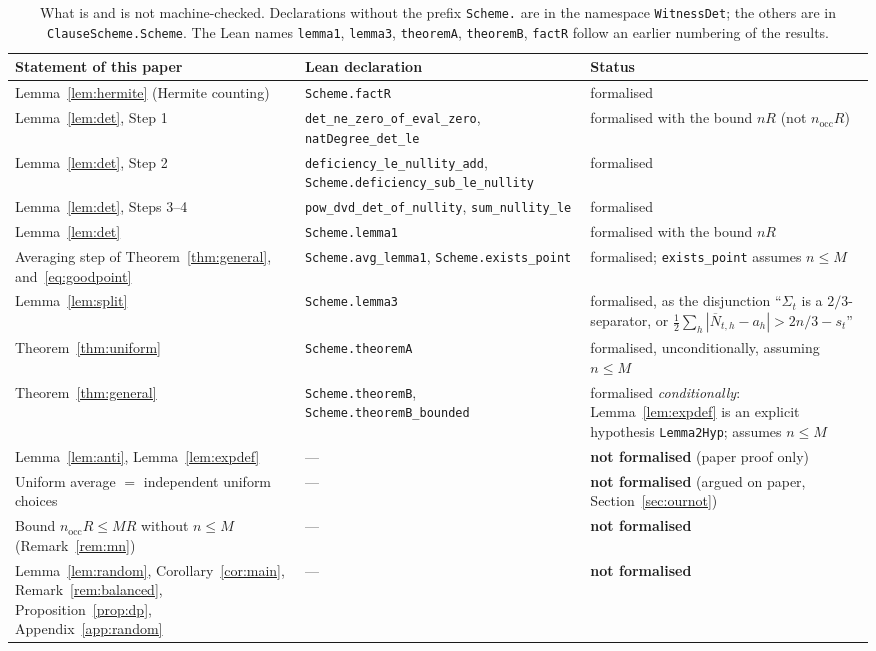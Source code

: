 \documentclass[11pt,a4paper]{article}
\theoremstyle{definition}
\theoremstyle{remark}
\newcommand{\nocc}{n_{\mathrm{occ}}}
\newcommand{\Nbar}{\overline{N}}
\begin{document}
\begin{table}[tb]
\centering
\small
\begin{tabular}{@{}>{\raggedright\arraybackslash}p{3.6cm}>{\raggedright\arraybackslash}p{6.1cm}>{\raggedright\arraybackslash}p{4.9cm}@{}}
\toprule
Statement of this paper & Lean declaration & Status\\
\midrule
Lemma~\ref{lem:hermite} (Hermite counting) & \texttt{Scheme.factR} & formalised\\[2pt]
Lemma~\ref{lem:det}, Step 1 & \texttt{det\_ne\_zero\_of\_eval\_zero}, \newline\texttt{natDegree\_det\_le} & formalised with the bound $nR$ (not $\nocc R$)\\[2pt]
Lemma~\ref{lem:det}, Step 2 & \texttt{deficiency\_le\_nullity\_add}, \newline\texttt{Scheme.deficiency\_sub\_le\_nullity} & formalised\\[2pt]
Lemma~\ref{lem:det}, Steps 3--4 & \texttt{pow\_dvd\_det\_of\_nullity}, \newline\texttt{sum\_nullity\_le} & formalised\\[2pt]
Lemma~\ref{lem:det} & \texttt{Scheme.lemma1} & formalised with the bound $nR$\\[2pt]
Averaging step of Theorem~\ref{thm:general}, and~\eqref{eq:goodpoint} & \texttt{Scheme.avg\_lemma1}, \newline\texttt{Scheme.exists\_point} & formalised; \texttt{exists\_point} assumes $n\le M$\\[2pt]
Lemma~\ref{lem:split} & \texttt{Scheme.lemma3} & formalised, as the disjunction ``$\Sigma_t$ is a $2/3$-separator, or $\frac12\sum_h|\Nbar_{t,h}-a_h|>2n/3-s_t$''\\[2pt]
Theorem~\ref{thm:uniform} & \texttt{Scheme.theoremA} & formalised, unconditionally, assuming $n\le M$\\[2pt]
Theorem~\ref{thm:general} & \texttt{Scheme.theoremB}, \newline\texttt{Scheme.theoremB\_bounded} & formalised \emph{conditionally}: Lemma~\ref{lem:expdef} is an explicit hypothesis \texttt{Lemma2Hyp}; assumes $n\le M$\\
\midrule
Lemma~\ref{lem:anti}, Lemma~\ref{lem:expdef} & --- & \textbf{not formalised} (paper proof only)\\[2pt]
Uniform average $=$ independent uniform choices & --- & \textbf{not formalised} (argued on paper, Section~\ref{sec:ournot})\\[2pt]
Bound $\nocc R\le MR$ without $n\le M$ (Remark~\ref{rem:mn}) & --- & \textbf{not formalised}\\[2pt]
Lemma~\ref{lem:random}, Corollary~\ref{cor:main}, Remark~\ref{rem:balanced}, Proposition~\ref{prop:dp}, Appendix~\ref{app:random} & --- & \textbf{not formalised}\\
\bottomrule
\end{tabular}
\caption{What is and is not machine-checked. Declarations without the prefix
\texttt{Scheme.} are in the namespace \texttt{WitnessDet}; the others are in
\texttt{ClauseScheme.Scheme}. The Lean names \texttt{lemma1}, \texttt{lemma3},
\texttt{theoremA}, \texttt{theoremB}, \texttt{factR} follow an earlier numbering of the
results.}\label{tab:lean}
\end{table}
\end{document}

